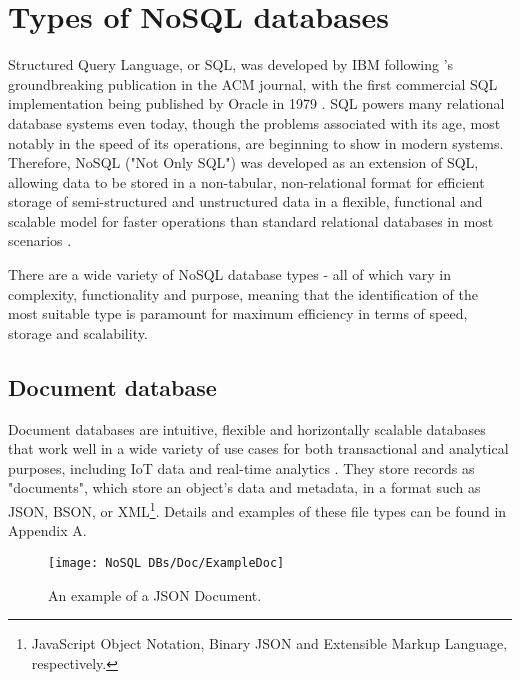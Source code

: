 \chapter{Types of NoSQL databases}
\noindent Structured Query Language, or SQL, was developed by IBM following \textcite{coddRelationalModelData1970}'s groundbreaking 
publication in the ACM journal, with the first commercial SQL implementation being published by Oracle in 1979 \autocite{oracleHistorySQL}.
SQL powers many relational database systems even today, though the problems associated with its age, most notably in 
the speed of its operations, are beginning to show in modern systems. Therefore, NoSQL ("Not Only SQL") was developed as 
an extension of SQL, allowing data to be stored in a non-tabular, non-relational format for efficient storage of
semi-structured and unstructured data in a flexible, functional and scalable model for faster operations than standard 
relational databases in most scenarios \autocite{googlecloudWhatNoSQLDatabases, awsWhatNoSQLDatabase}. 

\para There are a wide variety of NoSQL database types - all of which vary in complexity, functionality and purpose, meaning that the
identification of the most suitable type is paramount for maximum efficiency in terms of speed, storage and scalability. 


\section{Document database}\label{sec:DocDBs}
Document databases are intuitive, flexible and horizontally scalable databases that work well in a wide variety of use cases
for both transactional and analytical purposes, including IoT data and real-time analytics \autocite{mongodbDocumentDatabaseNoSQL}.
They store records as "documents", which store an object's data and metadata, in a format such as JSON, BSON, or XML\footnote{JavaScript Object Notation, Binary JSON and Extensible Markup Language, respectively.}. Details and examples of these file types can be found in Appendix A.


\begin{figure}[H]
    \centering  
    \texttt{[image: NoSQL DBs/Doc/ExampleDoc]}
    \caption{An example of a JSON Document.\label{fig:ExampleDoc}}
\end{figure}

